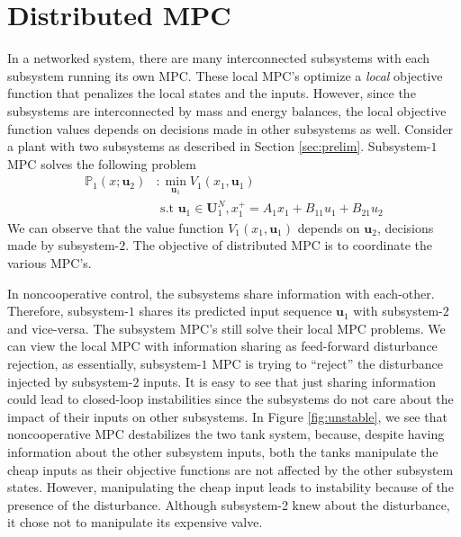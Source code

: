 \documentclass[10pt, twocolumn]{article}
\newcommand{\bu}{\mathbf{u}}
\theoremstyle{definition}
\begin{document}
\section{Distributed MPC}
In a networked system, there are many interconnected subsystems with each subsystem running its own MPC. These local MPC's optimize a {\emph{local}} objective function that penalizes the local states and the inputs. However, since the subsystems are interconnected by mass and energy balances, the local objective function values depends on decisions made in other subsystems as well. Consider a plant with two subsystems as described in Section \ref{sec:prelim}. Subsystem-$1$ MPC solves the following problem
\begin{align*} \mathbb{P}_1(x;\bu_2)&: \min_{\bu_1} {V_1(x_1,\bu_1)}\\& \text{~s.t~} \bu_1 \in \mathbf{U}_1^N, x_1^+= A_1x_1+B_{11}u_1+B_{21}u_2\end{align*}
We can observe that the value function $V_1(x_1,\bu_1)$ depends on $\bu_2$, decisions made by subsystem-$2$. The objective of distributed MPC is to coordinate the various MPC's.

In noncooperative control, the subsystems share information with each-other. Therefore, subsystem-$1$ shares its predicted input sequence $\bu_1$ with subsystem-$2$ and vice-versa. The subsystem MPC's still solve their local MPC problems. We can view the local MPC with information sharing as feed-forward disturbance rejection, as essentially, subsystem-$1$ MPC is trying to ``reject'' the disturbance injected by subsystem-$2$ inputs. It is easy to see that just sharing information could lead to closed-loop instabilities since the subsystems do not care about the impact of their inputs on other subsystems. In Figure \ref{fig:unstable}, we see that noncooperative MPC destabilizes the two tank system, because, despite having information about the other subsystem inputs, both the tanks manipulate the cheap inputs as their objective functions are not affected by the other subsystem states. However, manipulating the cheap input leads to instability because of the presence of the disturbance. Although subsystem-2 knew about the disturbance, it chose not to manipulate its expensive valve. 
\end{document}
